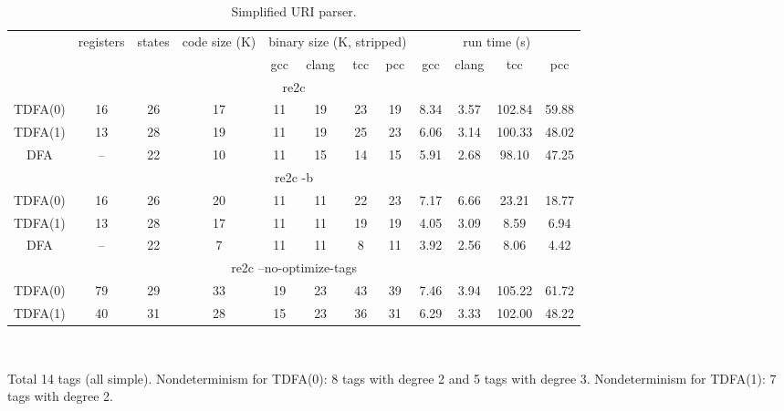 \documentclass{article}
\theoremstyle{definition}
\begin{document}
\begin{multicols}{2}
\begin{table}\label{table4}
\begin{center}
    \begin{tabular}{|c|ccccccccccc|}
    \hline
    & registers & states & code size (K) & \multicolumn{4}{c}{binary size (K, stripped)} & \multicolumn{4}{c|}{run time (s)} \\
    & & &
        & gcc & clang & tcc & pcc
        & gcc & clang & tcc & pcc \\
    \hline \hline
    \multicolumn{12}{|c|}{re2c} \\
    \hline
    TDFA(0) & 16 & 26 & 17 & 11 & 19 & 23 & 19 & 8.34 & 3.57 & 102.84 & 59.88 \\
    TDFA(1) & 13 & 28 & 19 & 11 & 19 & 25 & 23 & 6.06 & 3.14 & 100.33 & 48.02 \\
    DFA     & -- & 22 & 10 & 11 & 15 & 14 & 15 & 5.91 & 2.68 &  98.10 & 47.25 \\
    \hline \hline
    \multicolumn{12}{|c|}{re2c -b} \\
    \hline
    TDFA(0) & 16 & 26 & 20 & 11 & 11 & 22 & 23 & 7.17 & 6.66 & 23.21 & 18.77 \\
    TDFA(1) & 13 & 28 & 17 & 11 & 11 & 19 & 19 & 4.05 & 3.09 &  8.59 &  6.94 \\
    DFA     & -- & 22 &  7 & 11 & 11 &  8 & 11 & 3.92 & 2.56 &  8.06 &  4.42 \\
    \hline \hline
    \multicolumn{12}{|c|}{re2c --no-optimize-tags} \\
    \hline
    TDFA(0) & 79 & 29 & 33 & 19 & 23 & 43 & 39 & 7.46 & 3.94 & 105.22 & 61.72 \\
    TDFA(1) & 40 & 31 & 28 & 15 & 23 & 36 & 31 & 6.29 & 3.33 & 102.00 & 48.22 \\
    \hline
    \end{tabular}\\
    \caption{Simplified URI parser.}
    \smallskip
    \footnotesize{Total 14 tags (all simple).
    Nondeterminism for TDFA(0): 8 tags with degree 2 and 5 tags with degree 3.
    Nondeterminism for TDFA(1): 7 tags with degree 2.}
\end{center}
\end{table}


\end{multicols}
\end{document}
